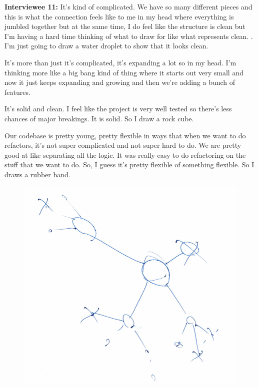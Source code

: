 \textbf{Interviewee 11:} It's kind of complicated. We have so many different pieces and this is what the connection feels like to me in my head where everything is jumbled together but at the same time, I do feel like the structure is clean but I'm having a hard time thinking of what to draw for like what represents clean. .  I'm just going to draw a water droplet to show that it looks clean.

It's more than just it's complicated, it's expanding a lot so in my head.  I'm thinking more like a big bang kind of thing where it starts out very small and now it just keeps expanding and growing and then we're adding a bunch of features. 

It's solid and clean. I feel like the project is very well tested so there's less chances of major breakings. It is solid. So I draw a rock cube.

Our codebase is pretty young, pretty flexible in ways that when we want to do refactors, it's not super complicated and not super hard to do. We are pretty good at like separating all the logic. It was really easy to do refactoring on the stuff that we want to do.  So, I guess it's pretty flexible of something flexible. So I draws a rubber band.

\begin{figure}[H]
\centering
\includegraphics[width=6.5in]{interviews/drawings/2015_12_10.png}
\caption{}
\end{figure}



